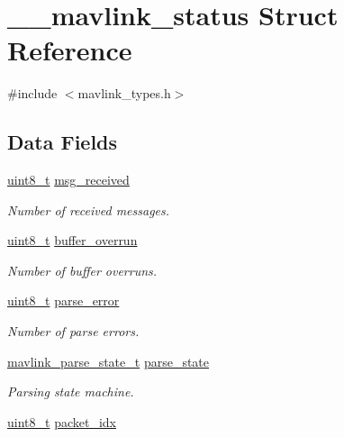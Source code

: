 \hypertarget{struct____mavlink__status}{\section{\-\_\-\-\_\-mavlink\-\_\-status Struct Reference}
\label{struct____mavlink__status}
}


{\ttfamily \#include $<$mavlink\-\_\-types.\-h$>$}

\subsection*{Data Fields}
\begin{DoxyCompactItemize}
\item 
\hyperlink{stdint_8h_aba7bc1797add20fe3efdf37ced1182c5}{uint8\-\_\-t} \hyperlink{struct____mavlink__status_a183576e45facc9da8123b7866d458680}{msg\-\_\-received}
\begin{DoxyCompactList}\small\item\em Number of received messages. \end{DoxyCompactList}\item 
\hyperlink{stdint_8h_aba7bc1797add20fe3efdf37ced1182c5}{uint8\-\_\-t} \hyperlink{struct____mavlink__status_ae0ceb5a136021ee78c953f2e86d772cb}{buffer\-\_\-overrun}
\begin{DoxyCompactList}\small\item\em Number of buffer overruns. \end{DoxyCompactList}\item 
\hyperlink{stdint_8h_aba7bc1797add20fe3efdf37ced1182c5}{uint8\-\_\-t} \hyperlink{struct____mavlink__status_ae7a52aa0c84929dbf181220c689f9ec8}{parse\-\_\-error}
\begin{DoxyCompactList}\small\item\em Number of parse errors. \end{DoxyCompactList}\item 
\hyperlink{mavlink__types_8h_a4eeb14ddb07e997fe1d671d6823e35a1}{mavlink\-\_\-parse\-\_\-state\-\_\-t} \hyperlink{struct____mavlink__status_aaf6742a61bbc641a4600184b3260fa0f}{parse\-\_\-state}
\begin{DoxyCompactList}\small\item\em Parsing state machine. \end{DoxyCompactList}\item 
\hyperlink{stdint_8h_aba7bc1797add20fe3efdf37ced1182c5}{uint8\-\_\-t} \hyperlink{struct____mavlink__status_a3e582235849323267974003eb1793e25}{packet\-\_\-idx}

\end{DoxyCompactItemize}
